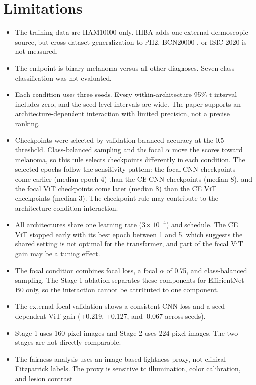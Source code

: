 \section{Limitations}

\begin{itemize}
  \item The training data are HAM10000 only. HIBA adds one external dermoscopic source, but cross-dataset generalization to PH2, BCN20000 \citep{combalia2019bcn20000}, or ISIC 2020 is not measured.
  \item The endpoint is binary melanoma versus all other diagnoses. Seven-class classification was not evaluated.
  \item Each condition uses three seeds. Every within-architecture 95\% t interval includes zero, and the seed-level intervals are wide. The paper supports an architecture-dependent interaction with limited precision, not a precise ranking.
  \item Checkpoints were selected by validation balanced accuracy at the 0.5 threshold. Class-balanced sampling and the focal $\alpha$ move the scores toward melanoma, so this rule selects checkpoints differently in each condition. The selected epochs follow the sensitivity pattern: the focal CNN checkpoints come earlier (median epoch 4) than the CE CNN checkpoints (median 8), and the focal ViT checkpoints come later (median 8) than the CE ViT checkpoints (median 3). The checkpoint rule may contribute to the architecture-condition interaction.
  \item All architectures share one learning rate ($3\times10^{-4}$) and schedule. The CE ViT stopped early with its best epoch between 1 and 5, which suggests the shared setting is not optimal for the transformer, and part of the focal ViT gain may be a tuning effect.
  \item The focal condition combines focal loss, a focal $\alpha$ of 0.75, and class-balanced sampling. The Stage 1 ablation separates these components for EfficientNet-B0 only, so the interaction cannot be attributed to one component.
  \item The external focal validation shows a consistent CNN loss and a seed-dependent ViT gain (+0.219, +0.127, and -0.067 across seeds).
  \item Stage 1 uses 160-pixel images and Stage 2 uses 224-pixel images. The two stages are not directly comparable.
  \item The fairness analysis uses an image-based lightness proxy, not clinical Fitzpatrick labels. The proxy is sensitive to illumination, color calibration, and lesion contrast.

\end{itemize}
